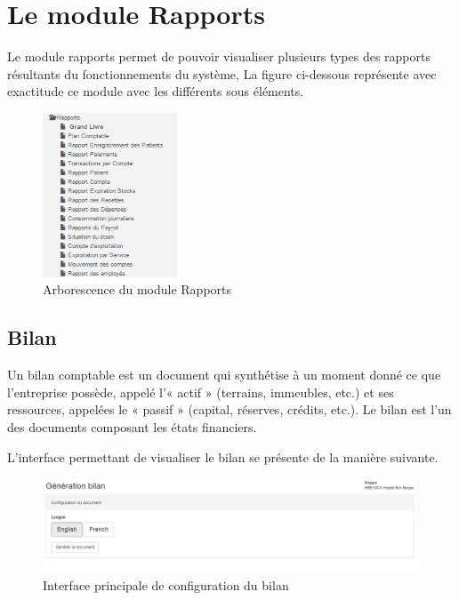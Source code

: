 \documentclass[12pt,a4paper]{report}
\begin{document}
\newpage
\chapter{Le module Rapports}        
Le module rapports permet de pouvoir visualiser plusieurs types des rapports résultants du fonctionnements du système, La figure ci-dessous représente avec exactitude ce module avec les différents sous éléments.

\begin{figure}[h]
\begin{center}
\includegraphics[width=4cm]{pic/ArboReport.png}
\end{center}
\caption{Arborescence du module Rapports}
\label{Arborescence du module Rapports}
\end{figure}

\newpage
\section{Bilan}
Un bilan  comptable est un document qui synthétise à un moment donné ce que l'entreprise possède, appelé l'« actif » (terrains, immeubles, etc.) et ses ressources, appelées le « passif » (capital, réserves, crédits, etc.). Le bilan est l'un des documents composant les états financiers.

L'interface permettant de visualiser le bilan se présente de la manière suivante.

\begin{figure}[h]
\begin{center}
\includegraphics[width=14cm]{pic/confBilan.png}
\end{center}
\caption{Interface principale de configuration du bilan}
\label{Interface principale de configuration du bilan}
\end{figure}
\end{document}
